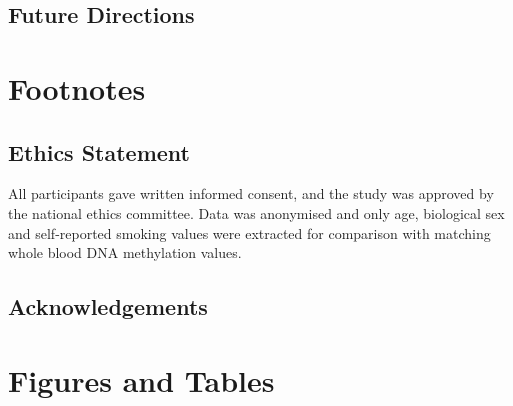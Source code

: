 \documentclass{article}
\begin{document}
\subsection*{Future Directions}

\section{Footnotes}

\subsection{Ethics Statement}
All participants gave written informed consent, and the study was approved by the national ethics committee. Data was anonymised and only age, biological sex and self-reported smoking values were extracted for comparison with matching whole blood DNA methylation values.

\subsection{Acknowledgements}

\section{Figures and Tables}
\end{document}
